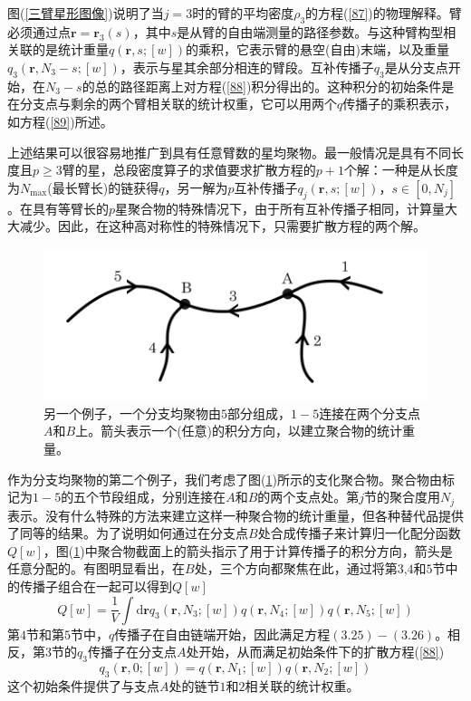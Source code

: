 图(\ref{三臂星形图像})说明了当$j=3$时的臂的平均密度$\rho _3$的方程(\ref{87})的物理解释。臂必须通过点$\mathbf{r}=\mathbf{r}_3(s)$，其中$s$是从臂的自由端测量的路径参数。与这种臂构型相关联的是统计重量$q(\mathbf{r},s;[w])$的乘积，它表示臂的悬空(自由)末端，以及重量$q_{3}(\mathbf{r},N_{3}-s;[w])$，表示与星其余部分相连的臂段。互补传播子$q_3$是从分支点开始，在$N_3-s$的总的路径距离上对方程(\ref{88})积分得出的。这种积分的初始条件是在分支点与剩余的两个臂相关联的统计权重，它可以用两个$q$传播子的乘积表示，如方程(\ref{89})所述。

上述结果可以很容易地推广到具有任意臂数的星均聚物。最一般情况是具有不同长度且$p\geq3$臂的星，总段密度算子的求值要求扩散方程的$p+1$个解：一种是从长度为$N_{\max}$(最长臂长)的链获得$q$，另一解为$p$互补传播子$q_j(\mathbf{r},s;[w])$，$s\in [0,N_j]$。在具有等臂长的$p$星聚合物的特殊情况下，由于所有互补传播子相同，计算量大大减少。因此，在这种高对称性的特殊情况下，只需要扩散方程的两个解。

\begin{figure}[H]
\centering
\includegraphics[scale=0.7]{./figures/36.png}
\caption{另一个例子，一个分支均聚物由$5$部分组成，$1-5$连接在两个分支点$A$和$B$上。箭头表示一个(任意)的积分方向，以建立聚合物的统计重量。}
\label{AB嵌段}
\end{figure}

作为分支均聚物的第二个例子，我们考虑了图(\ref{AB嵌段})所示的支化聚合物。聚合物由标记为$1-5$的五个节段组成，分别连接在$A$和$B$的两个支点处。第$j$节的聚合度用$N_j$表示。没有什么特殊的方法来建立这样一种聚合物的统计重量，但各种替代品提供了同等的结果。为了说明如何通过在分支点$B$处合成传播子来计算归一化配分函数$Q[w]$，图(\ref{AB嵌段})中聚合物截面上的箭头指示了用于计算传播子的积分方向，箭头是任意分配的。有图明显看出，在$B$处，三个方向都聚焦在此，通过将第$3$,$4$和$5$节中的传播子组合在一起可以得到$Q[w]$
\begin{equation}
Q[w]=\frac{1}{V}\int \mathrm{d}\mathbf{r}q_3(\mathbf{r},N_3;[w])q(\mathbf{r},N_4;[w])q(\mathbf{r},N_5;[w])
\end{equation}
第$4$节和第$5$节中，$q$传播子在自由链端开始，因此满足方程$(3.25)-(3.26)$。相反，第3节的$q_3$传播子在分支点$A$处开始，从而满足初始条件下的扩散方程(\ref{88})
\begin{equation}
q_3(\mathbf{r},0;[w])=q(\mathbf{r},N_1;[w])q(\mathbf{r},N_2;[w])
\end{equation}
这个初始条件提供了与支点$A$处的链节$1$和$2$相关联的统计权重。

